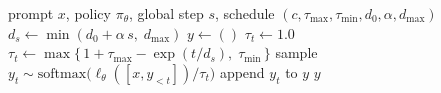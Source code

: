 \begin{algorithm}[t]
\small
\caption{}
\label{alg:ead}
\begin{algorithmic}[1]
\Require prompt $x$, policy $\pi_\theta$, global step $s$, schedule $(c,\tau_{\max},\tau_{\min},d_0,\alpha,d_{\max})$
\State $d_s \leftarrow \min(d_0 + \alpha\,s,\; d_{\max})$ 
\State $y \leftarrow ()$
    \State $\tau_t \leftarrow 1.0$ 
  \Else
    \State $\tau_t \leftarrow \max\{\,1 + \tau_{\max} - \exp(t / d_s),\;\tau_{\min}\,\}$
  \EndIf
  \State sample $y_t \sim \mathrm{softmax}\!\big(\ell_\theta([x, y_{<t}]) / \tau_t\big)$
  \State append $y_t$ to $y$
\EndFor
\State \Return $y$
\end{algorithmic}
\end{algorithm}



%

